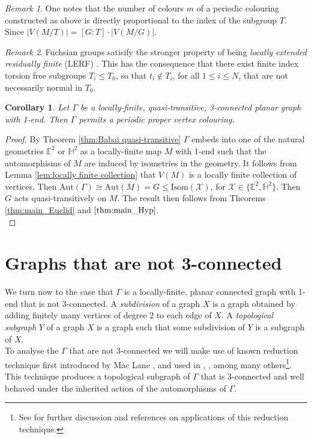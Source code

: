 \documentclass{article}
\numberwithin{equation}{section}
\newcommand{\EE}{\mathbb{E}}
\newcommand{\HH}{\mathbb{H}}
\newtheorem{corollary}[lemma]{Corollary}
\theoremstyle{definition}
\theoremstyle{remark}
\newtheorem{remark}{Remark}[section]
\begin{document}
\begin{remark}\label{rem:index_colours}
One notes that the number of colours $m$ of a periodic colouring constructed as above is directly proportional to the index of the subgroup $T$. Since $|V(M/T)|=[G:T]\cdot |V(M/G)|$.
\end{remark}
\begin{remark}\label{rem:LERF}
    Fuchsian groups satisify the stronger property of being \textit{locally extended residually finite} (LERF) \cite{Lopez94}. This has the consequence that there exist finite index torsion free subgroups $T_i\leq T_0$, so that $t_i\notin T_i$, for all $1\leq i\leq N$, that are not necessarily normal in $T_0$.
\end{remark}

\begin{corollary}
    Let $\Gamma$ be a locally-finite, quasi-transitive, 3-connected planar graph with 1-end. Then $\Gamma$ permits a periodic proper vertex colouring.
\end{corollary}
\begin{proof}
    By Theorem \ref{thm:Babai quasi-transitive} $\Gamma$ embeds into one of the natural geometries $\EE^2$ or $\HH^2$ as a locally-finite map $M$ with 1-end such that the automorphisms of $M$ are induced by isometries in the geometry. It follows from Lemma \ref{lem:locally finite collection} that $V(M)$ is a locally finite collection of vertices. Then $\text{Aut}(\Gamma)\cong\text{Aut}(M)=G\leq \text{Isom}(\mathcal{X})$, for $\mathcal{X}\in\{\EE^2,\HH^2\}$. Then $G$ acts quasi-transitively on $M$. The result then follows from Theorems \ref{thm:main_Euclid} and $\ref{thm:main_Hyp}$.\\
\end{proof}

\section{Graphs that are not 3-connected}\label{sec:not_3-con}
We turn now to the case that $\Gamma$ is a locally-finite, planar connected graph with 1-end that is not 3-connected.
A \textit{subdivision} of a graph $X$ is a graph obtained by adding finitely many vertices of degree 2 to each edge of $X$. A \textit{topological subgraph} $Y$ of a graph $X$ is a graph such that some subdivision of $Y$ is a subgraph of $X$. \\
To analyse the $\Gamma$ that are not 3-connected we will make use of known reduction technique first introduced by Mac Lane \cite{MacLane_Reduction}, and used in \cite{Babai1975}, \cite{Babai97}, \cite{Hopcroft1972} among many others\footnote{See \cite{KlavNedZeman2021} for further discussion and references on applications of this reduction technique.}. 
This technique produces a topological subgraph of $\Gamma$ that is 3-connected and well behaved under the inherited action of the automorphisms of $\Gamma$. 
\end{document}
